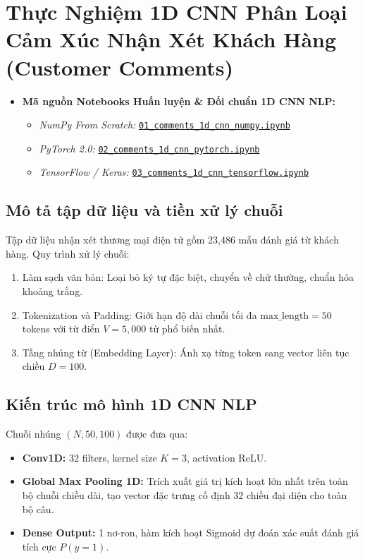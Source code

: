 \documentclass[12pt,a4paper]{report}
\begin{document}
\section{Thực Nghiệm 1D CNN Phân Loại Cảm Xúc Nhận Xét Khách Hàng (Customer Comments)}

\begin{itemize}[leftmargin=1.5em, itemsep=2pt]
    \item \textbf{Mã nguồn Notebooks Huấn luyện \& Đối chuẩn 1D CNN NLP:}
    \begin{itemize}[leftmargin=1.2em, itemsep=1.5pt]
        \item \textit{NumPy From Scratch:} \href{https://github.com/phamtu2x5/INTELLIGENT-SYSTEM-DEVELOPMENT/blob/main/src/Assigment%2004/customer_comments/notebooks/01_comments_1d_cnn_numpy.ipynb}{\texttt{01\_comments\_1d\_cnn\_numpy.ipynb}}
        \item \textit{PyTorch 2.0:} \href{https://github.com/phamtu2x5/INTELLIGENT-SYSTEM-DEVELOPMENT/blob/main/src/Assigment%2004/customer_comments/notebooks/02_comments_1d_cnn_pytorch.ipynb}{\texttt{02\_comments\_1d\_cnn\_pytorch.ipynb}}
        \item \textit{TensorFlow / Keras:} \href{https://github.com/phamtu2x5/INTELLIGENT-SYSTEM-DEVELOPMENT/blob/main/src/Assigment%2004/customer_comments/notebooks/03_comments_1d_cnn_tensorflow.ipynb}{\texttt{03\_comments\_1d\_cnn\_tensorflow.ipynb}}
    \end{itemize}
\end{itemize}

\subsection{Mô tả tập dữ liệu và tiền xử lý chuỗi}
Tập dữ liệu nhận xét thương mại điện tử gồm 23,486 mẫu đánh giá từ khách hàng. Quy trình xử lý chuỗi:
\begin{enumerate}
    \item Làm sạch văn bản: Loại bỏ ký tự đặc biệt, chuyển về chữ thường, chuẩn hóa khoảng trắng.
    \item Tokenization và Padding: Giới hạn độ dài chuỗi tối đa $\text{max\_length} = 50$ tokens với từ điển $V = 5,000$ từ phổ biến nhất.
    \item Tầng nhúng từ (Embedding Layer): Ánh xạ từng token sang vector liên tục chiều $D=100$.
\end{enumerate}

\subsection{Kiến trúc mô hình 1D CNN NLP}
Chuỗi nhúng $(N, 50, 100)$ được đưa qua:
\begin{itemize}
    \item \textbf{Conv1D:} 32 filters, kernel size $K=3$, activation ReLU.
    \item \textbf{Global Max Pooling 1D:} Trích xuất giá trị kích hoạt lớn nhất trên toàn bộ chuỗi chiều dài, tạo vector đặc trưng cố định 32 chiều đại diện cho toàn bộ câu.
    \item \textbf{Dense Output:} 1 nơ-ron, hàm kích hoạt Sigmoid dự đoán xác suất đánh giá tích cực $P(y=1)$.
\end{itemize}
\end{document}
